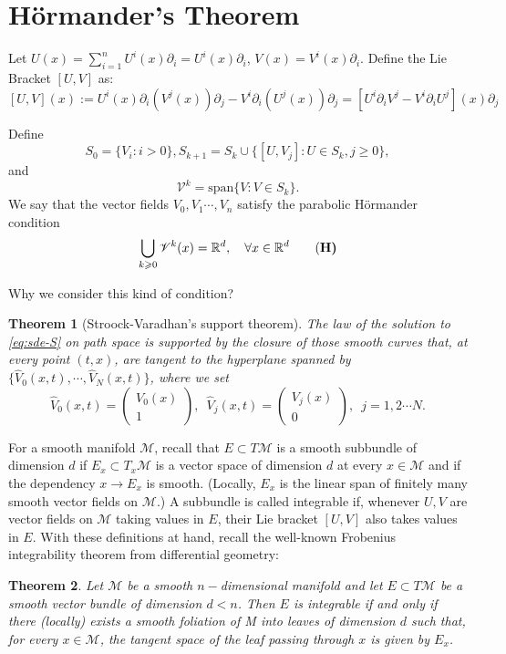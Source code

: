 \documentclass[twoside, 12pt]{book}
\numberwithin{equation}{chapter}
\newtheorem{theorem}{Theorem}[section]
\def\cM{{\mathcal M}}
\def\mR{{\mathbb R}}
\def\sV{{\mathscr V}}
\def\geq{\geqslant}
\def\p{\partial}
\begin{document}
    
    

    \section{Hörmander's Theorem}
	
	Let $U(x)=\sum_{i=1}^n U^i(x)\p_i=U^i(x)\partial_i$, $V(x)=V^i(x)\p_i$. Define the Lie Bracket  $[U, V]$ as: 
	\[
	     [U,V](x):= U^i(x) \p_i(V^j(x))\p_j-V^i\p_i(U^j(x))\p_j= [U^i \p_iV^j  -V^i\p_i U^j](x)\p_j
	\]


	Define 
	$$S_0=\{V_i : i>0\}, S_{k+1}=S_k\cup \{[U,V_j]: U\in S_k, j\geq 0\}, $$
	and 
	$$\sV^k=\mbox{span} \{V: V\in S_k\}. $$
	We say that the vector fields $V_0, V_1\cdots, V_n$  satisfy the parabolic H\"ormander condition 
	\begin{align}\label{aspt:H}
	    \bigcup_{k\geq 0} \sV^k(x) = \mR^d, \quad \forall x\in \mR^d   \tag{\bf{H}}
	\end{align} 
	
	Why we consider this kind of condition? 
	
	\begin{theorem}[Stroock-Varadhan's support theorem]
		The law of the solution to \eqref{eq:sde-S} on path space is supported by the closure of those smooth curves that, at every point $(t, x)$, are tangent to the hyperplane spanned by $\{\hat{V}_0(x,t), \cdots , \hat{V}_N(x,t)\}$, where we set 
		$$\hat{V}_0(x,t)=\begin{pmatrix} V_0(x)\\ 1 \end{pmatrix},  \,\,\, \hat{V}_j(x,t)=\begin{pmatrix} V_j(x)\\ 0 \end{pmatrix}, \,\,\, j=1,2\cdots N. $$
	\end{theorem}
	
	
	
	For a smooth manifold $\cM$, recall that $E \subset T\cM$ is a smooth subbundle of dimension $d$ if $E_x \subset T_x\cM$ is a vector space of dimension $d$ at every $x \in \cM$ and if the dependency $x \to E_x$ is smooth. (Locally, $E_x$ is the linear span of finitely many smooth vector fields on $\cM$.) A subbundle is called integrable if, whenever $U, V$ are vector fields on $\cM$ taking values in $E$, their Lie bracket $[U, V ]$ also takes values in $E$.
	With these definitions at hand, recall the well-known Frobenius integrability theorem from differential geometry:
	\begin{theorem}
		Let $\cM $ be a smooth $n-$dimensional manifold and let $E \subset T \cM$ be a smooth vector bundle of dimension $d < n$. Then $E $ is integrable if and only if there (locally) exists a smooth foliation of M into leaves of dimension $d$ such that, for every $x\in  \cM$, the tangent space of the leaf passing through $x$ is given by $E_x$.
		
	\end{theorem}
	
\end{document}
